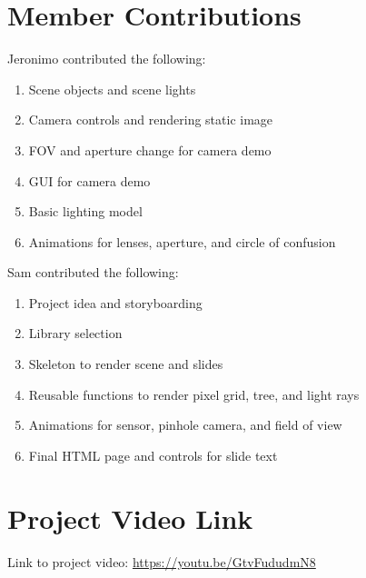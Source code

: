 \documentclass{acm_proc_article-sp}
\begin{document}
\bigskip
\bigskip
\bigskip

\section{Member Contributions}

Jeronimo contributed the following:

\begin{enumerate}
  \item Scene objects and scene lights
  \item Camera controls and rendering static image
  \item FOV and aperture change for camera demo
  \item GUI for camera demo
  \item Basic lighting model
  \item Animations for lenses, aperture, and circle of confusion
\end{enumerate}

Sam contributed the following:

\begin{enumerate}
  \item Project idea and storyboarding
  \item Library selection
  \item Skeleton to render scene and slides
  \item Reusable functions to render pixel grid, tree, and light rays
  \item Animations for sensor, pinhole camera, and field of view
  \item Final HTML page and controls for slide text
\end{enumerate}

\section{Project Video Link}

Link to project video: \url{https://youtu.be/GtvFududmN8}





\end{document}
